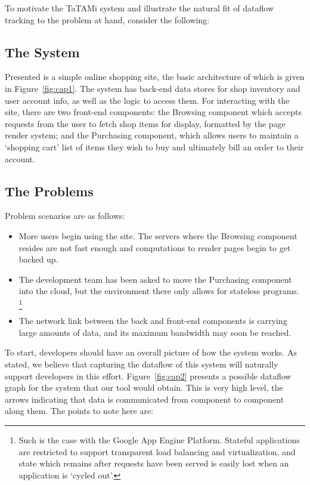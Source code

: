 \documentclass[msc,oneside]{ubcthesis}
\begin{document}
To motivate the TaTAMi system and illustrate the natural fit of dataflow tracking to the problem at hand, consider the following:

\subsection{The System}

Presented is a simple online shopping site, the basic architecture of which is given in Figure~\ref{fig:cap1}. The system has back-end data stores for shop inventory and user account info, as well as the logic to access them. For interacting with the site, there are two front-end components: the Browsing component which accepts requests from the user to fetch shop items for display, formatted by the page render system; and the Purchasing component, which allows users to maintain a `shopping cart' list of items they wish to buy and ultimately bill an order to their account. 

\subsection{The Problems}

Problem scenarios are as follows:

\begin{itemize}
\item More users begin using the site. The servers where the Browsing component resides are not fast enough and computations to render pages begin to get backed up.
\item The development team has been asked to move the Purchasing component into the cloud, but the environment there only allows for stateless programs. \footnote{Such is the case with the Google App Engine Platform. Stateful applications are restricted to support transparent load balancing and virtualization, and state which remains after requests have been served is easily lost when an application is `cycled out'.}
\item The network link between the back and front-end components is carrying large amounts of data, and its maximum bandwidth may soon be reached.
\end{itemize}

To start, developers should have an overall picture of how the system works. As stated, we believe that capturing the dataflow of this system will naturally support developers in this effort. Figure~\ref{fig:cap2} presents a possible dataflow graph for the system that our tool would obtain. This is very high level, the arrows indicating that data is communicated from component to component along them. The points to note here are:\\
\end{document}
